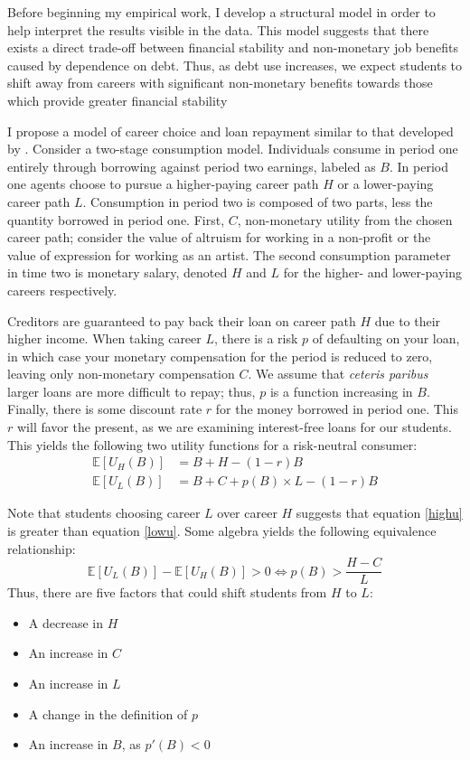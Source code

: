 \documentclass[12pt]{article}
\begin{document}
	Before beginning my empirical work, I develop a structural model in order to help interpret the results visible in the data. This model suggests that there exists a direct trade-off between financial stability and non-monetary job benefits caused by dependence on debt. Thus, as debt use increases, we expect students to shift away from careers with significant non-monetary benefits towards those which provide greater financial stability

	I propose a model of career choice and loan repayment similar to that developed by \textcite{abraham2018}. Consider a two-stage consumption model. Individuals consume in period one entirely through borrowing against period two earnings, labeled as $B$. In period one agents choose to pursue a higher-paying career path $H$ or a lower-paying career path $L$. Consumption in period two is composed of two parts, less the quantity borrowed in period one. First, $C$, non-monetary utility from the chosen career path; consider the value of altruism for working in a non-profit or the value of expression for working as an artist. The second consumption parameter in time two is monetary salary, denoted $H$ and $L$ for the higher- and lower-paying careers respectively.
	
	Creditors are guaranteed to pay back their loan on career path $H$ due to their higher income. When taking career $L$, there is a risk $p$ of defaulting on your loan, in which case your monetary compensation for the period is reduced to zero, leaving only non-monetary compensation $C$. We assume that \emph{ceteris paribus} larger loans are more difficult to repay; thus, $p$ is a function increasing in $B$. Finally, there is some discount rate $r$ for the money borrowed in period one. This $r$ will favor the present, as we are examining interest-free loans for our students. This yields the following two utility functions for a risk-neutral consumer: 
	\begin{align}
	\mathbb{E}\left[U_H(B)\right] &= B + H - (1 - r)B \label{highu}\\
	\mathbb{E}\left[U_L(B)\right] &= B + C + p(B) \times L - (1 - r)B \label{lowu}
	\end{align}
	
	Note that students choosing career $L$ over career $H$ suggests that equation \ref{highu} is greater than equation \ref{lowu}. Some algebra yields the following equivalence relationship: 
	\begin{equation}
	\mathbb{E}\left[U_L(B)\right] - \mathbb{E}\left[U_H(B)\right] > 0 \iff p(B) > \frac{H - C}{L} \label{choicecon}
	\end{equation} 
	Thus, there are five factors that could shift students from $H$ to $L$:
	\begin{itemize}
		\singlespacing
		\item A decrease in $H$
		\item An increase in $C$
		\item An increase in $L$
		\item A change in the definition of $p$
		\item An increase in $B$, as $p'(B) < 0$
	\end{itemize}
\end{document}
